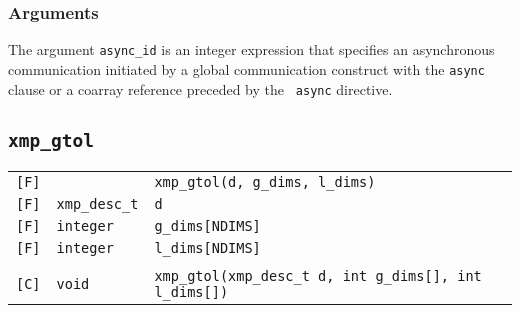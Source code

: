 \subsubsection*{Arguments}

The argument {\tt async\_id} is an integer expression that specifies an
asynchronous communication initiated by a global communication construct
with the {\tt async} clause or a coarray reference preceded by the {\tt
async} directive.

\vspace{0.3cm}

\subsection{\tt xmp\_gtol}

\begin{tabular}{lll}

\verb![F]!& & {\tt xmp\_gtol(d, g\_dims, l\_dims)} \\
\verb![F]!& {\tt xmp\_desc\_t} & {\tt d}\\
\verb![F]!& {\tt integer} & {\tt g\_dims[NDIMS]}\\
\verb![F]!& {\tt integer} & {\tt l\_dims[NDIMS]}\\
          & & \\
\verb![C]!&  {\tt void} & {\tt xmp\_gtol(xmp\_desc\_t d, int g\_dims[], int l\_dims[])}

\end{tabular}


